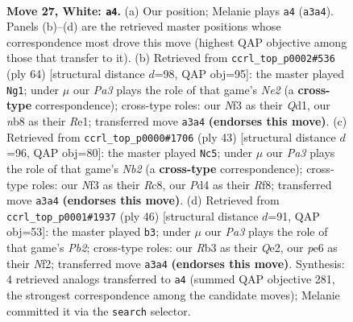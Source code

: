 \documentclass[11pt]{article}
\begin{document}
\begin{figure}[p]
\label{fig:thought-m50}
\end{figure}

\clearpage

\begin{figure}[p]\centering
\begin{subfigure}{0.46\textwidth}\centering
\resizebox{\linewidth}{!}{%
\newchessgame
\chessboard[
  setfen={rn1qr1k1/2pn3p/1p2p1p1/p3Pp2/3P1P1P/PR3NN1/2PK2PQ/7R w - - 2 27},
  showmover=false,
  pgfstyle=straightmove, color=movearrow, markmove={a3-a4}
]}
\caption{}
\end{subfigure}\hfill
\begin{subfigure}{0.46\textwidth}\centering
\resizebox{\linewidth}{!}{%
\newchessgame
\chessboard[
  setfen={2rr2k1/4qp2/pp1ppnp1/2n4p/P1P1P3/1PN2PP1/3RN1KP/3QR3 w - - 0 33},
  showmover=false,
  pgfstyle=straightmove, color=movearrow, markmove={e2-g1}
]}
\caption{}
\end{subfigure}
\\[4pt]
\begin{subfigure}{0.46\textwidth}\centering
\resizebox{\linewidth}{!}{%
\newchessgame
\chessboard[
  setfen={2r2rk1/1nqp3p/1p1n1ppP/p2Pp3/2P1P1P1/P4N2/1P1NQ3/1KR4R b - - 0 22},
  showmover=false,
  pgfstyle=straightmove, color=movearrow, markmove={b7-c5}
]}
\caption{}
\end{subfigure}\hfill
\begin{subfigure}{0.46\textwidth}\centering
\resizebox{\linewidth}{!}{%
\newchessgame
\chessboard[
  setfen={5r2/1r2q1pk/R2ppnnp/1pp1p3/4P3/3PPN1P/1PP1QNP1/R5K1 w - - 12 24},
  showmover=false,
  pgfstyle=straightmove, color=movearrow, markmove={b2-b3}
]}
\caption{}
\end{subfigure}
\caption{\textbf{Move 27, White: \texttt{a4}.} (a) Our position; Melanie plays \texttt{a4} (\texttt{a3a4}). Panels (b)--(d) are the retrieved master positions whose correspondence most drove this move (highest QAP objective among those that transfer to it). (b) Retrieved from \texttt{ccrl\_top\_p0002\#536} (ply 64) [structural distance $d$=98, QAP obj=95]: the master played \texttt{Ng1}; under $\mu$ our \emph{Pa3} plays the role of that game's \emph{Ne2} (a \textbf{cross-type} correspondence); cross-type roles: our \emph{N}f3 as their \emph{Q}d1, our \emph{n}b8 as their \emph{R}e1; transferred move \texttt{a3a4} \textbf{(endorses this move)}. (c) Retrieved from \texttt{ccrl\_top\_p0000\#1706} (ply 43) [structural distance $d$=96, QAP obj=80]: the master played \texttt{Nc5}; under $\mu$ our \emph{Pa3} plays the role of that game's \emph{Nb2} (a \textbf{cross-type} correspondence); cross-type roles: our \emph{N}f3 as their \emph{R}c8, our \emph{P}d4 as their \emph{R}f8; transferred move \texttt{a3a4} \textbf{(endorses this move)}. (d) Retrieved from \texttt{ccrl\_top\_p0001\#1937} (ply 46) [structural distance $d$=91, QAP obj=53]: the master played \texttt{b3}; under $\mu$ our \emph{Pa3} plays the role of that game's \emph{Pb2}; cross-type roles: our \emph{R}b3 as their \emph{Q}e2, our \emph{p}e6 as their \emph{N}f2; transferred move \texttt{a3a4} \textbf{(endorses this move)}. Synthesis: 4 retrieved analogs transferred to \texttt{a4} (summed QAP objective 281, the strongest correspondence among the candidate moves); Melanie committed it via the \texttt{search} selector.}

\end{figure}
\end{document}
